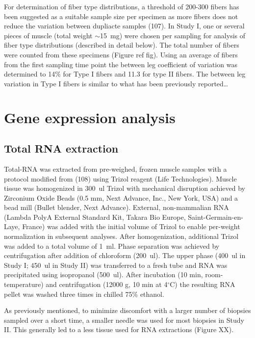 \documentclass[twoside,10pt]{gihclass} %
\begin{document}
For determination of fiber type distributions, a threshold of 200-300
fibers has been suggested as a suitable sample size per specimen as more
fibers does not reduce the variation between dupliacte samples
(107).
In Study I, one or several pieces of muscle (total weight
\(\sim\)\SI{15}{mg}) were chosen per sampling for analysis of fiber type
distributions (described in detail below). The total number of fibers
were counted from these specimens (Figure ref fig). Using an average of
fibers from the first sampling time point the between leg coefficient of
variation was determined to 14\% for Type I fibers and 11.3 for type II
fibers. The between leg variation in Type I fibers is similar to what
has been previously reported\ldots{}

\hypertarget{gene-expression-analysis}{%
\section{Gene expression analysis}\label{gene-expression-analysis}}

\hypertarget{total-rna-extraction}{%
\subsection{Total RNA extraction}\label{total-rna-extraction}}

Total-RNA was extracted from pre-weighed, frozen muscle samples with a protocol modified from
(108)
using Trizol reagent (Life Technologies).
Muscle tissue was homogenized in \SI{300}{ul} Trizol with mechanical disruption achieved by Zirconium Oxide Beads (0.5 mm, Next Advance, Inc., New York, USA) and a bead mill (Bullet blender, Next Advance). External, non-mammalian RNA (Lambda PolyA External Standard Kit, Takara Bio Europe, Saint-Germain-en-Laye, France) was added with the initial volume of Trizol to enable per-weight normalization in subsequent analyses. After homogenization, additional Trizol was added to a total volume of \SI{1}{ml}. Phase separation was achieved by centrifugation after addition of chloroform (\SI{200}{ul}). The upper phase (\SI{400}{ul} in Study I; \SI{450}{ul} in Study II) was transferred to a fresh tube and RNA was precipitated using isopropanol (\SI{500}{ul}). After incubation (10 min, room-temperature) and centrifugation (12000 g, 10 min at 4\(^{\circ}\)C) the resulting RNA pellet was washed three times in chilled 75\% ethanol.

As previously mentioned, to minimize discomfort with a larger number of biopsies sampled over a short time, a smaller needle was used for most biopsies in Study II. This generally led to a less tissue used for RNA extractions (Figure XX).
\end{document}
